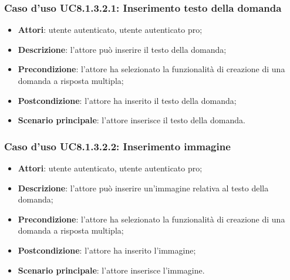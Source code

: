 \subsubsection{Caso d'uso UC8.1.3.2.1: Inserimento testo della domanda}
	\begin{itemize}
		\item
			\textbf{Attori}: utente autenticato, utente autenticato pro;
		\item		
			\textbf{Descrizione}: l'attore può inserire il testo della domanda;
		\item
			\textbf{Precondizione}: l'attore ha selezionato la funzionalità di creazione di una domanda a risposta multipla; 
		\item
			\textbf{Postcondizione}: l'attore ha inserito il testo della domanda;
		\item
			\textbf{Scenario principale}: l'attore inserisce il testo della domanda. 
	 			
	\end{itemize}
	
\subsubsection{Caso d'uso UC8.1.3.2.2: Inserimento immagine}
	\begin{itemize}
		\item
			\textbf{Attori}: utente autenticato, utente autenticato pro;
		\item		
			\textbf{Descrizione}: l'attore può inserire un'immagine relativa al testo della domanda;
		\item
			\textbf{Precondizione}: l'attore ha selezionato la funzionalità di creazione di una domanda a risposta multipla; 
		\item
			\textbf{Postcondizione}: l'attore ha inserito l'immagine;
		\item
			\textbf{Scenario principale}: l'attore inserisce l'immagine. 	
	\end{itemize}
	
	
